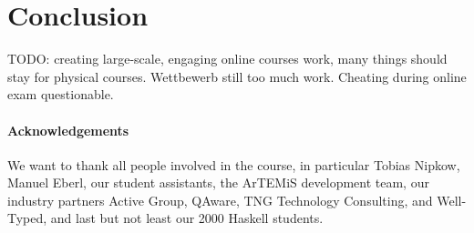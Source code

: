 \section{Conclusion}\label{sec:conclusion}

TODO: creating large-scale, engaging online courses work,
many things should stay for physical courses.
Wettbewerb still too much work.
Cheating during online exam questionable.

\paragraph{Acknowledgements}
We want to thank all people involved in the course,
in particular Tobias Nipkow,
Manuel Eberl,
our student assistants,
the ArTEMiS development team,
our industry partners
Active Group,
QAware,
TNG Technology Consulting,
and Well-Typed,
and last but not least our 2000 Haskell students.

